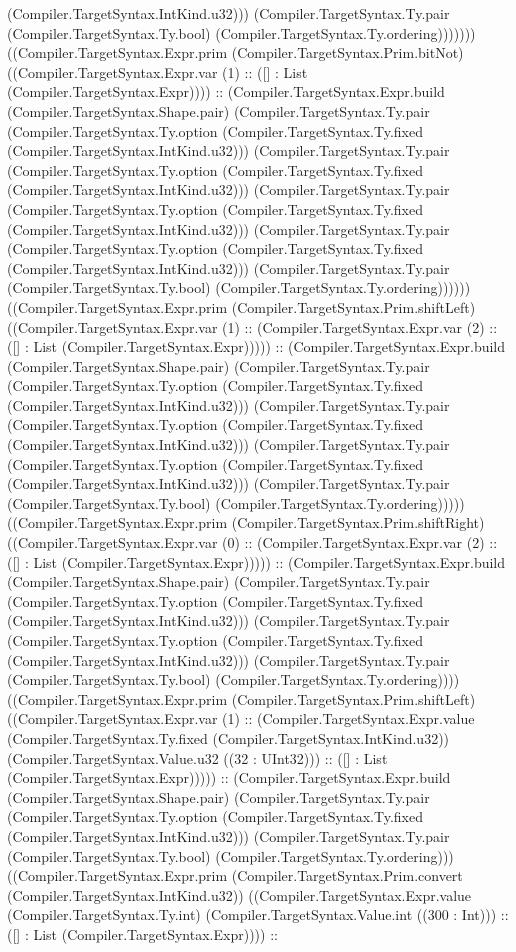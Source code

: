 \documentclass[11pt]{article}
\begin{document}
(Compiler.TargetSyntax.IntKind.u32))) (Compiler.TargetSyntax.Ty.pair (Compiler.TargetSyntax.Ty.bool) (Compiler.TargetSyntax.Ty.ordering))))))) ((Compiler.TargetSyntax.Expr.prim (Compiler.TargetSyntax.Prim.bitNot) ((Compiler.TargetSyntax.Expr.var (1) :: ([] : List (Compiler.TargetSyntax.Expr)))) :: (Compiler.TargetSyntax.Expr.build (Compiler.TargetSyntax.Shape.pair) (Compiler.TargetSyntax.Ty.pair (Compiler.TargetSyntax.Ty.option (Compiler.TargetSyntax.Ty.fixed (Compiler.TargetSyntax.IntKind.u32))) (Compiler.TargetSyntax.Ty.pair (Compiler.TargetSyntax.Ty.option (Compiler.TargetSyntax.Ty.fixed (Compiler.TargetSyntax.IntKind.u32))) (Compiler.TargetSyntax.Ty.pair (Compiler.TargetSyntax.Ty.option (Compiler.TargetSyntax.Ty.fixed (Compiler.TargetSyntax.IntKind.u32))) (Compiler.TargetSyntax.Ty.pair (Compiler.TargetSyntax.Ty.option (Compiler.TargetSyntax.Ty.fixed (Compiler.TargetSyntax.IntKind.u32))) (Compiler.TargetSyntax.Ty.pair (Compiler.TargetSyntax.Ty.bool) (Compiler.TargetSyntax.Ty.ordering)))))) ((Compiler.TargetSyntax.Expr.prim (Compiler.TargetSyntax.Prim.shiftLeft) ((Compiler.TargetSyntax.Expr.var (1) :: (Compiler.TargetSyntax.Expr.var (2) :: ([] : List (Compiler.TargetSyntax.Expr))))) :: (Compiler.TargetSyntax.Expr.build (Compiler.TargetSyntax.Shape.pair) (Compiler.TargetSyntax.Ty.pair (Compiler.TargetSyntax.Ty.option (Compiler.TargetSyntax.Ty.fixed (Compiler.TargetSyntax.IntKind.u32))) (Compiler.TargetSyntax.Ty.pair (Compiler.TargetSyntax.Ty.option (Compiler.TargetSyntax.Ty.fixed (Compiler.TargetSyntax.IntKind.u32))) (Compiler.TargetSyntax.Ty.pair (Compiler.TargetSyntax.Ty.option (Compiler.TargetSyntax.Ty.fixed (Compiler.TargetSyntax.IntKind.u32))) (Compiler.TargetSyntax.Ty.pair (Compiler.TargetSyntax.Ty.bool) (Compiler.TargetSyntax.Ty.ordering))))) ((Compiler.TargetSyntax.Expr.prim (Compiler.TargetSyntax.Prim.shiftRight) ((Compiler.TargetSyntax.Expr.var (0) :: (Compiler.TargetSyntax.Expr.var (2) :: ([] : List (Compiler.TargetSyntax.Expr))))) :: (Compiler.TargetSyntax.Expr.build (Compiler.TargetSyntax.Shape.pair) (Compiler.TargetSyntax.Ty.pair (Compiler.TargetSyntax.Ty.option (Compiler.TargetSyntax.Ty.fixed (Compiler.TargetSyntax.IntKind.u32))) (Compiler.TargetSyntax.Ty.pair (Compiler.TargetSyntax.Ty.option (Compiler.TargetSyntax.Ty.fixed (Compiler.TargetSyntax.IntKind.u32))) (Compiler.TargetSyntax.Ty.pair (Compiler.TargetSyntax.Ty.bool) (Compiler.TargetSyntax.Ty.ordering)))) ((Compiler.TargetSyntax.Expr.prim (Compiler.TargetSyntax.Prim.shiftLeft) ((Compiler.TargetSyntax.Expr.var (1) :: (Compiler.TargetSyntax.Expr.value (Compiler.TargetSyntax.Ty.fixed (Compiler.TargetSyntax.IntKind.u32)) (Compiler.TargetSyntax.Value.u32 ((32 : UInt32))) :: ([] : List (Compiler.TargetSyntax.Expr))))) :: (Compiler.TargetSyntax.Expr.build (Compiler.TargetSyntax.Shape.pair) (Compiler.TargetSyntax.Ty.pair (Compiler.TargetSyntax.Ty.option (Compiler.TargetSyntax.Ty.fixed (Compiler.TargetSyntax.IntKind.u32))) (Compiler.TargetSyntax.Ty.pair (Compiler.TargetSyntax.Ty.bool) (Compiler.TargetSyntax.Ty.ordering))) ((Compiler.TargetSyntax.Expr.prim (Compiler.TargetSyntax.Prim.convert (Compiler.TargetSyntax.IntKind.u32)) ((Compiler.TargetSyntax.Expr.value (Compiler.TargetSyntax.Ty.int) (Compiler.TargetSyntax.Value.int ((300 : Int))) :: ([] : List (Compiler.TargetSyntax.Expr)))) :: 
\end{document}
